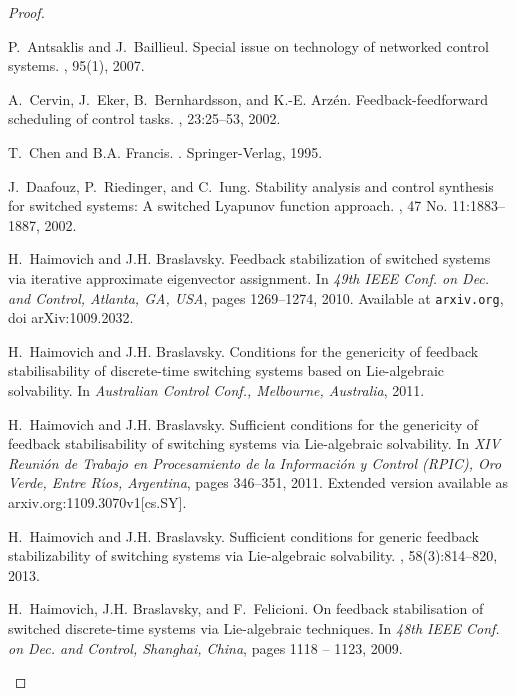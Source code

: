 \documentclass[letterpaper, 10 pt, conference]{ieeeconf}
\begin{document}
\begin{proof}
\begin{thebibliography}{10}
P.~Antsaklis and J.~Baillieul.
 {S}pecial issue on technology of networked control
  systems.
, 95(1), 2007.

A.~Cervin, J.~Eker, B.~Bernhardsson, and K.-E. Arz\'en.
\newblock Feedback-feedforward scheduling of control tasks.
, 23:25--53, 2002.

T.~Chen and B.A. Francis.
.
\newblock Springer-Verlag, 1995.

J.~Daafouz, P.~Riedinger, and C.~Iung.
\newblock Stability analysis and control synthesis for switched systems: A
  switched {Lyapunov} function approach.
, 47 No. 11:1883--1887, 2002.

H.~Haimovich and J.H. Braslavsky.
\newblock Feedback stabilization of switched systems via iterative approximate
  eigenvector assignment.
\newblock In {\em 49th IEEE Conf. on Dec. and Control, Atlanta, GA, USA}, pages
  1269--1274, 2010.
\newblock Available at \texttt{arxiv.org}, doi arXiv:1009.2032.

H.~Haimovich and J.H. Braslavsky.
\newblock Conditions for the genericity of feedback stabilisability of
  discrete-time switching systems based on {L}ie-algebraic solvability.
\newblock In {\em Australian Control Conf., Melbourne, Australia}, 2011.

H.~Haimovich and J.H. Braslavsky.
\newblock Sufficient conditions for the genericity of feedback stabilisability
  of switching systems via {Lie}-algebraic solvability.
\newblock In {\em XIV Reuni\'on de Trabajo en Procesamiento de la Informaci\'on
  y Control (RPIC), Oro Verde, Entre R\'{\i}os, Argentina}, pages 346--351,
  2011.
\newblock Extended version available as arxiv.org:1109.3070v1{[cs.SY]}.

H.~Haimovich and J.H. Braslavsky.
\newblock Sufficient conditions for generic feedback stabilizability of
  switching systems via {L}ie-algebraic solvability.
, 58(3):814--820, 2013.

H.~Haimovich, J.H. Braslavsky, and F.~Felicioni.
\newblock On feedback stabilisation of switched discrete-time systems via
  {L}ie-algebraic techniques.
\newblock In {\em 48th IEEE Conf. on Dec. and Control, Shanghai, China}, pages
  1118 -- 1123, 2009.


\end{thebibliography}
\end{proof}
\end{document}
